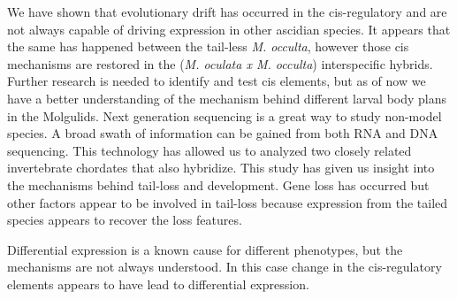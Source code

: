 We have shown that evolutionary drift has occurred in the cis-regulatory and are not always capable of driving expression in other ascidian species. It appears that the same has happened between the tail-less \textit{M. occulta}, however those cis mechanisms are restored in the (\textit{M. oculata x M. occulta}) interspecific hybrids. Further research is needed to identify and test cis elements, but as of now we have a better understanding of the mechanism behind different larval body plans in the Molgulids. Next generation sequencing is a great way to study non-model species. A broad swath of information can be gained from both RNA and DNA sequencing. This technology has allowed us to analyzed two closely related invertebrate chordates that also hybridize. This study has given us insight into the mechanisms behind tail-loss and development. Gene loss has occurred but other factors appear to be involved in tail-loss because expression from the tailed species appears to recover the loss features. 

Differential expression is a known cause for different phenotypes, but the mechanisms are not always understood. In this case change in the cis-regulatory elements appears to have lead to differential expression.
